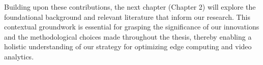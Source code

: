 Building upon these contributions, the next chapter (Chapter 2) will explore the foundational background and relevant literature that inform our research. This contextual groundwork is essential for grasping the significance of our innovations and the methodological choices made throughout the thesis, thereby enabling a holistic understanding of our strategy for optimizing edge computing and video analytics.